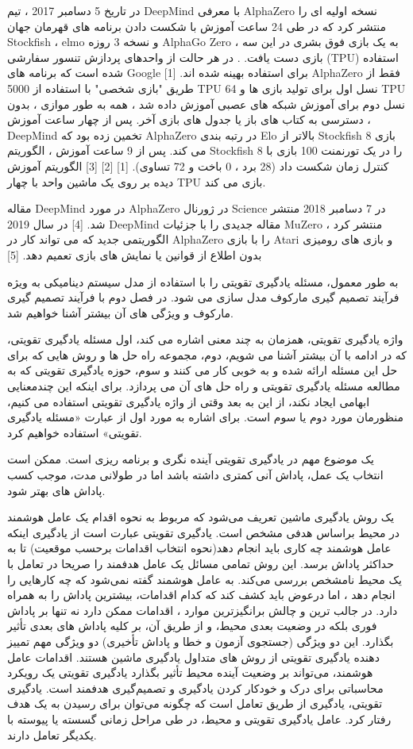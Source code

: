 در تاریخ 5 دسامبر 2017 ، تیم DeepMind با معرفی AlphaZero نسخه اولیه ای را منتشر کرد که در طی 24 ساعت آموزش با شکست دادن برنامه های قهرمان جهان Stockfish ، elmo و نسخه 3 روزه AlphaGo Zero ، به یک بازی فوق بشری در این سه بازی دست یافت. . در هر حالت از واحدهای پردازش تنسور سفارشی (TPU) استفاده شده است که برنامه های Google برای استفاده بهینه شده اند. [1] AlphaZero فقط از طریق "بازی شخصی" با استفاده از 5000 TPU نسل اول برای تولید بازی ها و 64 TPU نسل دوم برای آموزش شبکه های عصبی آموزش داده شد ، همه به طور موازی ، بدون دسترسی به کتاب های باز یا جدول های بازی آخر. پس از چهار ساعت آموزش ، DeepMind تخمین زده بود که AlphaZero در رتبه بندی Elo بالاتر از Stockfish 8 بازی می کند. پس از 9 ساعت آموزش ، الگوریتم Stockfish 8 را در یک تورنمنت 100 بازی با کنترل زمان شکست داد (28 برد ، 0 باخت و 72 تساوی). [1] [2] [3] الگوریتم آموزش دیده بر روی یک ماشین واحد با چهار TPU بازی می کند.

مقاله DeepMind در مورد AlphaZero در ژورنال Science در 7 دسامبر 2018 منتشر شد. [4] در سال 2019 DeepMind مقاله جدیدی را با جزئیات MuZero منتشر کرد ، الگوریتمی جدید که می تواند کار در AlphaZero را با بازی Atari و بازی های رومیزی بدون اطلاع از قوانین یا نمایش های بازی تعمیم دهد. [5]


به طور معمول، مسئله یادگیری تقویتی را با استفاده از مدل سیستم دینامیکی به ویژه فرآیند تصمیم گیری مارکوف مدل سازی می شود. در فصل دوم با فرآیند تصمیم گیری مارکوف و ویژگی های آن بیشتر آشنا خواهیم شد.

واژه یادگیری تقویتی، همزمان به چند معنی اشاره می کند، اول مسئله یادگیری تقویتی، که در ادامه با آن بیشتر آشنا می شویم،  دوم، مجموعه راه حل ها و روش هایی که برای حل این مسئله ارائه شده و به خوبی کار می کنند و سوم، حوزه یادگیری تقویتی که به مطالعه مسئله یادگیری تقویتی و راه حل های آن می پردازد. برای اینکه این چندمعنایی ابهامی ایجاد نکند، از این به بعد وقتی از واژه یادگیری تقویتی استفاده می کنیم، منظورمان  مورد دوم یا سوم است. برای اشاره به مورد اول از عبارت «مسئله یادگیری تقویتی» استفاده خواهیم کرد. 

یک موضوع مهم در یادگیری تقویتی آینده نگری و برنامه ریزی است. ممکن است انتخاب یک عمل، پاداش آنی کمتری داشته باشد اما در طولانی مدت، موجب کسب پاداش های بهتر شود. 

یک روش یادگیری ماشین تعریف می‌شود که مربوط به نحوه اقدام یک عامل هوشمند  در محیط براساس هدفی مشخص است. یادگیری تقویتی عبارت است از یادگیری اینکه عامل هوشمند چه کاری باید انجام دهد(نحوه انتخاب اقدامات برحسب موقعیت) تا به حداکثر پاداش برسد. این روش تمامی‌ مسائل یک عامل هدفمند را صریحا در تعامل با یک محیط نامشخص بررسی می‌کند. به عامل هوشمند گفته نمی‌شود که چه کارهایی را انجام دهد ، اما درعوض باید کشف کند که کدام اقدامات، بیشترین پاداش را به همراه دارد. در جالب ترین و چالش برانگیزترین موارد ، اقدامات ممکن دارد نه تنها بر پاداش فوری بلکه در وضعیت بعدی محیط، و از طریق آن، بر کلیه پاداش های بعدی تأثیر بگذارد. این دو ویژگی (جستجوی آزمون و خطا و پاداش تأخیری) دو ویژگی مهم تمییز دهنده یادگیری تقویتی از روش های متداول یادگیری ماشین هستند.
اقدامات عامل هوشمند، می‌تواند بر وضعیت آینده محیط تأثیر بگذارد
یادگیری تقویتی یک رویکرد محاسباتی برای درک و خودکار کردن یادگیری و تصمیم‌گیری هدفمند است.
یادگیری تقویتی، یادگیری از  طریق تعامل است که چگونه می‌توان برای رسیدن به یک هدف رفتار کرد.
عامل یادگیری تقویتی و محیط، در طی مراحل زمانی گسسته یا پیوسته با یکدیگر تعامل دارند.

